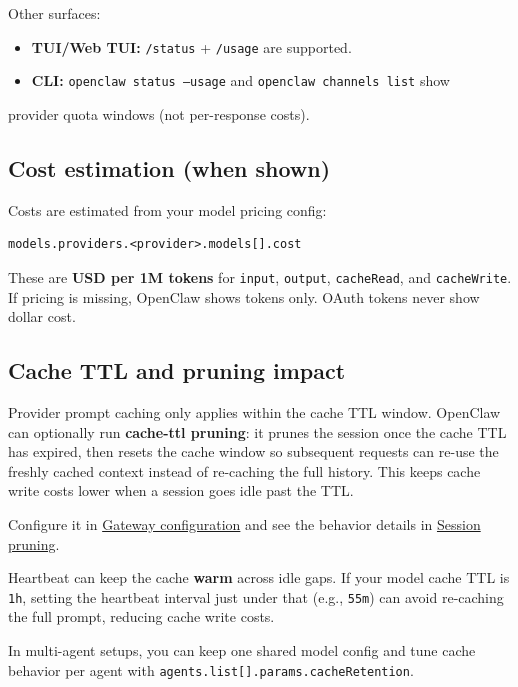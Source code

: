 Other surfaces:

\begin{itemize}
  \item \textbf{TUI/Web TUI:} \texttt{/status} + \texttt{/usage} are supported.
  \item \textbf{CLI:} \texttt{openclaw status --usage} and \texttt{openclaw channels list} show
\end{itemize}

provider quota windows (not per-response costs).

\subsection{Cost estimation (when shown)}


Costs are estimated from your model pricing config:

\begin{lstlisting}
models.providers.<provider>.models[].cost
\end{lstlisting}


These are \textbf{USD per 1M tokens} for \texttt{input}, \texttt{output}, \texttt{cacheRead}, and
\texttt{cacheWrite}. If pricing is missing, OpenClaw shows tokens only. OAuth tokens
never show dollar cost.

\subsection{Cache TTL and pruning impact}


Provider prompt caching only applies within the cache TTL window. OpenClaw can
optionally run \textbf{cache-ttl pruning}: it prunes the session once the cache TTL
has expired, then resets the cache window so subsequent requests can re-use the
freshly cached context instead of re-caching the full history. This keeps cache
write costs lower when a session goes idle past the TTL.

Configure it in \href{/gateway/configuration}{Gateway configuration} and see the
behavior details in \href{/concepts/session-pruning}{Session pruning}.

Heartbeat can keep the cache \textbf{warm} across idle gaps. If your model cache TTL
is \texttt{1h}, setting the heartbeat interval just under that (e.g., \texttt{55m}) can avoid
re-caching the full prompt, reducing cache write costs.

In multi-agent setups, you can keep one shared model config and tune cache behavior
per agent with \texttt{agents.list[].params.cacheRetention}.

